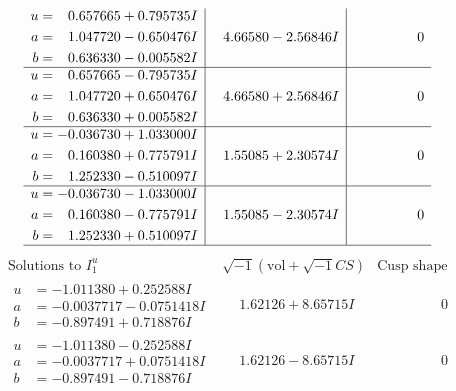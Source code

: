 \documentclass[1p]{elsarticle_modified}
\theoremstyle{definition}
\newcommand{\I}{\sqrt{-1}}
\begin{document}
$$\begin{array}{c|c|c}
\begin{aligned}
u &= \phantom{-}0.657665 + 0.795735 I \\
a &= \phantom{-}1.047720 - 0.650476 I \\
b &= \phantom{-}0.636330 - 0.005582 I\end{aligned}
 & \phantom{-}4.66580 - 2.56846 I & \phantom{-0.000000 } 0 \\ \hline\begin{aligned}
u &= \phantom{-}0.657665 - 0.795735 I \\
a &= \phantom{-}1.047720 + 0.650476 I \\
b &= \phantom{-}0.636330 + 0.005582 I\end{aligned}
 & \phantom{-}4.66580 + 2.56846 I & \phantom{-0.000000 } 0 \\ \hline\begin{aligned}
u &= -0.036730 + 1.033000 I \\
a &= \phantom{-}0.160380 + 0.775791 I \\
b &= \phantom{-}1.252330 - 0.510097 I\end{aligned}
 & \phantom{-}1.55085 + 2.30574 I & \phantom{-0.000000 } 0 \\ \hline\begin{aligned}
u &= -0.036730 - 1.033000 I \\
a &= \phantom{-}0.160380 - 0.775791 I \\
b &= \phantom{-}1.252330 + 0.510097 I\end{aligned}
 & \phantom{-}1.55085 - 2.30574 I & \phantom{-0.000000 } 0\\
 \hline 
 \end{array}$$\newpage$$\begin{array}{c|c|c}  
\text{Solutions to }I^u_{1}& \I (\text{vol} + \sqrt{-1}CS) & \text{Cusp shape}\\
 \hline 
\begin{aligned}
u &= -1.011380 + 0.252588 I \\
a &= -0.0037717 - 0.0751418 I \\
b &= -0.897491 + 0.718876 I\end{aligned}
 & \phantom{-}1.62126 + 8.65715 I & \phantom{-0.000000 } 0 \\ \hline\begin{aligned}
u &= -1.011380 - 0.252588 I \\
a &= -0.0037717 + 0.0751418 I \\
b &= -0.897491 - 0.718876 I\end{aligned}
 & \phantom{-}1.62126 - 8.65715 I & \phantom{-0.000000 } 0 \\ \hline\begin{aligned}

\end{aligned}
\end{array}$$
\end{document}
